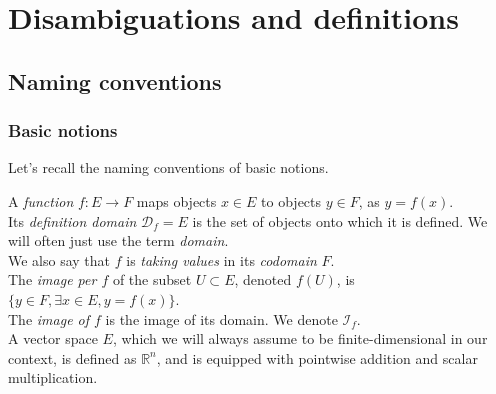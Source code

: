 \documentclass{article}
\newcommand{\domain}{\mathcal{D}}
\newcommand{\image}{\mathcal{I}}
\newcommand{\real}{\mathbb{R}}
\begin{document}
\section{Disambiguations and definitions}






\subsection{Naming conventions}
\label{basic}

\subsubsection{Basic notions}

Let's recall the naming conventions of basic notions.

A \emph{function} $f: E \rightarrow F$ maps objects $x \in E$ to objects $y \in F$, as $y = f(x)$.\\
Its \emph{definition domain} $\domain_f = E$ is the set of objects onto which it is defined. We will often just use the term \emph{domain}.\\
We also say that $f$ is \emph{taking values} in its \emph{codomain} $F$.\\
The \emph{image per $f$} of the subset $U \subset E$, denoted $f(U)$, is $\{y \in F, \exists x \in E, y = f(x)\}$.\\
The \emph{image of $f$} is the image of its domain. We denote $\image_f$.\\
A vector space $E$, which we will always assume to be finite-dimensional in our context, is defined as $\real^n$, and is equipped with pointwise addition and scalar multiplication.%
\end{document}
